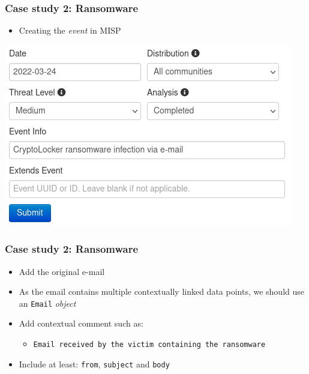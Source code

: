 \begin{frame}
    \frametitle{Case study 2: Ransomware}
    \begin{itemize}
        \item Creating the \textit{event} in MISP
    \end{itemize}
    \includegraphics[width=1.0\linewidth]{pictures/case2/event.png}
\end{frame}

\begin{frame}
    \frametitle{Case study 2: Ransomware}
    \begin{itemize}
        \item Add the original e-mail
        \item As the email contains multiple contextually linked data points, we should use an \texttt{Email} \textit{object}
        \item Add contextual comment such as:
        \begin{itemize}
            \item \texttt{Email received by the victim containing the ransomware}
        \end{itemize}
        \item Include at least: \texttt{from}, \texttt{subject} and \texttt{body}
    \end{itemize}
\end{frame}

